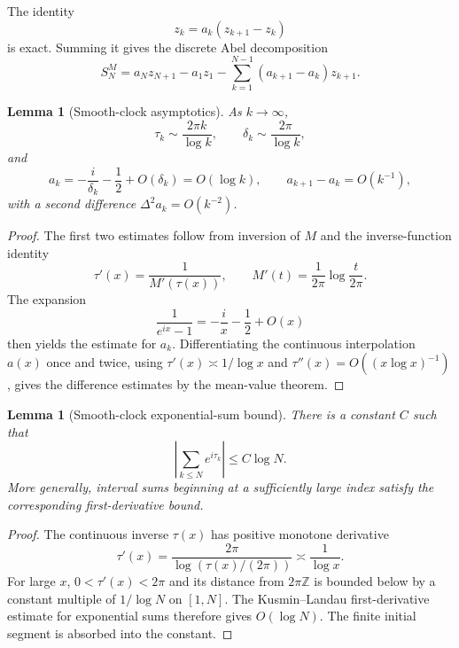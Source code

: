 \documentclass[11pt]{article}
\newtheorem{lemma}[theorem]{Lemma}
\theoremstyle{definition}
\theoremstyle{remark}
\begin{document}
The identity
\[
z_k=a_k(z_{k+1}-z_k)
\]
is exact.  Summing it gives the discrete Abel decomposition
\begin{equation}\label{eq:AbelSN}
S_N^{M}
=a_Nz_{N+1}-a_1z_1-
\sum_{k=1}^{N-1}(a_{k+1}-a_k)z_{k+1}.
\end{equation}

\begin{lemma}[Smooth-clock asymptotics]\label{lem:clockasym}
As $k\to\infty$,
\[
\tau_k\sim\frac{2\pi k}{\log k},\qquad
\delta_k\sim\frac{2\pi}{\log k},
\]
and
\[
a_k=-\frac{i}{\delta_k}-\frac12+O(\delta_k)=O(\log k),
\qquad
a_{k+1}-a_k=O(k^{-1}),
\]
with a second difference $\Delta^2a_k=O(k^{-2})$.
\end{lemma}
\begin{proof}
The first two estimates follow from inversion of $M$ and the inverse-function identity
\[
\tau'(x)=\frac1{M'(\tau(x))},\qquad
M'(t)=\frac1{2\pi}\log\frac{t}{2\pi}.
\]
The expansion
\[
\frac1{e^{ix}-1}=-\frac{i}{x}-\frac12+O(x)
\]
then yields the estimate for $a_k$.  Differentiating the continuous interpolation $a(x)$ once and twice, using $\tau'(x)\asymp1/\log x$ and $\tau''(x)=O((x\log x)^{-1})$, gives the difference estimates by the mean-value theorem.
\end{proof}

\begin{lemma}[Smooth-clock exponential-sum bound]\label{lem:KL}
There is a constant $C$ such that
\[
\left|\sum_{k\le N}e^{i\tau_k}\right|\le C\log N.
\]
More generally, interval sums beginning at a sufficiently large index satisfy the corresponding first-derivative bound.
\end{lemma}
\begin{proof}
The continuous inverse $\tau(x)$ has positive monotone derivative
\[
\tau'(x)=\frac{2\pi}{\log(\tau(x)/(2\pi))}\asymp\frac1{\log x}.
\]
For large $x$, $0<\tau'(x)<2\pi$ and its distance from $2\pi\mathbb Z$ is bounded below by a constant multiple of $1/\log N$ on $[1,N]$.  The Kusmin--Landau first-derivative estimate for exponential sums therefore gives $O(\log N)$.  The finite initial segment is absorbed into the constant.
\end{proof}
\end{document}
